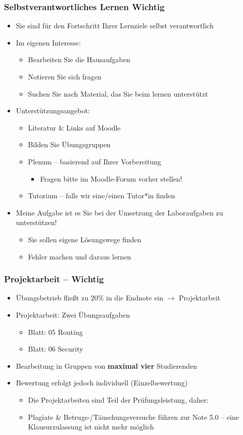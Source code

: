 \documentclass[xcolor=dvipsnames,aspectratio=169]{beamer}
\begin{document}
\begin{frame}
	\frametitle{Selbstverantwortliches Lernen \textbf{Wichtig}}
	\begin{itemize}
		\item Sie sind für den Fortschritt Ihrer Lernziele selbst verantwortlich
		\item Im eigenen Interesse:
		\begin{itemize}
			\item Bearbeiten Sie die Hausaufgaben
			\item Notieren Sie sich fragen
			\item Suchen Sie nach Material, das Sie beim lernen unterstützt
		\end{itemize}
		\item Unterstützungsangebot:
		\begin{itemize}
			\item Literatur \& Links auf Moodle
			\item Bilden Sie Übungsgruppen
			\item Plenum -- basierend auf Ihrer Vorbereitung
			\begin{itemize}
				\item Fragen bitte im Moodle-Forum vorher stellen!
			\end{itemize}
			\item Tutorium -- falls wir eine/einen Tutor*in finden
		\end{itemize}
		\item Meine Aufgabe ist es Sie bei der Umsetzung der Laboraufgaben zu unterstützen!
		\begin{itemize}
			\item Sie sollen eigene Lösungswege finden
			\item Fehler machen und daraus lernen
		\end{itemize}
	\end{itemize}
\end{frame}

\begin{frame}
	\frametitle{Projektarbeit -- \textbf{Wichtig}}
	\begin{itemize}
		\item Übungsbetrieb fließt zu 20\% in die Endnote ein $\rightarrow$ Projektarbeit
		\item Projektarbeit: Zwei Übungsaufgaben
		\begin{itemize}
			\item Blatt: 05 Routing
			\item Blatt: 06 Security
		\end{itemize}
		\item Bearbeitung in Gruppen von \textbf{maximal vier} Studierenden
		\item Bewertung erfolgt jedoch individuell (Einzelbewertung)
		\begin{itemize}
			\item Die Projektarbeiten sind Teil der Prüfungsleistung, daher:
			\item Plagiate \& Betrugs-/Täuschungsversuche führen zur Note 5.0 -- eine Klausurzulassung ist nicht mehr möglich
		\end{itemize}
		\end{itemize}
\end{frame}
\end{document}
